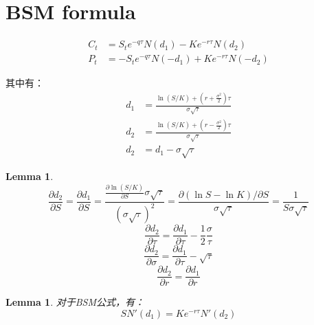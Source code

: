 \documentclass[11pt]{article}
\newtheorem{lemma}[theorem]{Lemma}
\begin{document}
\section{BSM formula}
\begin{align*}
    C_t &= S_te^{-q\tau}N(d_1) - Ke^{-r\tau}N(d_2) \\
    P_t &= -S_te^{-q\tau}N(-d_1) + Ke^{-r\tau}N(-d_2)
\end{align*}

其中有：
\begin{align*}
    d_1 &= \frac{\ln(S/K) + (r+\frac{\sigma^2}{2})\tau}{\sigma \sqrt{\tau}} \\
    d_2 &= \frac{\ln(S/K) + (r-\frac{\sigma^2}{2})\tau}{\sigma \sqrt{\tau}} \\
    d_2 &= d_1 - \sigma \sqrt{\tau}
\end{align*}

\begin{lemma}
    \begin{equation*}
        \frac{\partial d_2}{\partial S} = \frac{\partial d_1}{\partial S} = \frac{\frac{\partial \ln(S/K)}{\partial S} \sigma \sqrt{\tau}}{(\sigma \sqrt{\tau})^2} = \frac{\partial (\ln S - \ln K)/\partial S}{\sigma\sqrt{\tau}} = \frac{1}{S\sigma\sqrt{\tau}}
    \end{equation*}
    \begin{equation*}
        \frac{\partial d_2}{\partial \tau} = \frac{\partial d_1}{\partial \tau} - \frac{1}{2}\frac{\sigma}{\tau}
    \end{equation*}
    \begin{equation*}
        \frac{\partial d_2}{\partial \sigma} = \frac{\partial d_1}{\partial \tau} - \sqrt{\tau}
    \end{equation*}
    \begin{equation*}
        \frac{\partial d_2}{\partial r} = \frac{\partial d_1}{\partial r}
    \end{equation*}
\end{lemma}

\begin{lemma}
    对于BSM公式，有：
    \begin{equation*}
        SN'(d_1) = Ke^{-r\tau} N'(d_2)
    \end{equation*}
\end{lemma}
\end{document}

